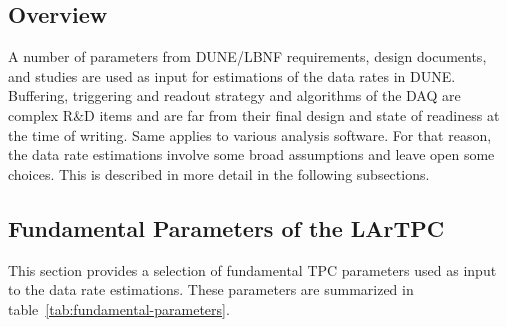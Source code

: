 \subsection{Overview}

A number of parameters from DUNE/LBNF requirements, design documents,  and studies are used  as input
for estimations of the data rates in DUNE.
Buffering, triggering and readout strategy and algorithms of the DAQ
are complex R\&D items and are far from their final design and state of
readiness at the time of writing. Same applies to various analysis software.
For that reason, the data rate estimations involve some broad assumptions
and leave open some choices. This is described in more detail in the following subsections.

\subsection{Fundamental Parameters of the LArTPC}

This section provides a selection of fundamental TPC parameters used as
input to the data rate estimations. These parameters are summarized in
table~\ref{tab:fundamental-parameters}.

